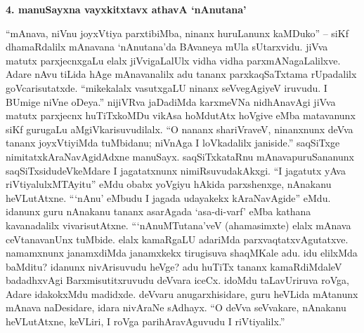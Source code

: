 \bigskip
\begin{center}
{\Large\bf 4. manuSayxna vayxkitxtavx athavA `nAnutana'}
\end{center}

``mAnava, niVnu joyxVtiya parxtibiMba, ninanx huruLanunx kaMDuko'' -- siKf dhamaRdalilx mAnavana `nAnutana'da BAvaneya mUla sUtarxvidu. jiVva matutx parxjecnxgaLu elalx jiVvigaLalUlx vidha vidha parxmANagaLalilxve. Adare nAvu tiLida hAge mAnavanalilx adu tananx parxkaqSaTxtama rUpadalilx goVcarisutatxde. ``mikekalalx vasutxgaLU ninanx seVvegAgiyeV iruvudu. I BUmige niVne oDeya.'' nijiVRva jaDadiMda karxmeVNa nidhAnavAgi jiVva matutx parxjecnx huTiTxkoMDu vikAsa hoMdutAtx hoVgive eMba matavanunx siKf gurugaLu aMgiVkarisuvudilalx. ``O nananx shariVraveV, ninanxnunx deVva tananx joyxVtiyiMda tuMbidanu; niVnAga I loVkadalilx janiside.'' saqSiTxge nimitatxkAraNavAgidAdxne manuSayx. saqSiTxkataRnu mAnavapuruSananunx saqSiTxsidudeVkeMdare I jagatatxnunx nimiRsuvudakAkxgi. ``I jagatutx yAva riVtiyalulxMTAyitu'' eMdu obabx yoVgiyu hAkida parxshenxge, nAnakanu heVLutAtxne. ```nAnu' eMbudu I jagada udayakekx kAraNavAgide'' eMdu. idanunx guru nAnakanu tananx asarAgada `asa-di-varf' eMba kathana kavanadalilx vivarisutAtxne. ```nAnuMTutana'veV (ahamasimxte) elalx mAnava ceVtanavanUnx tuMbide. elalx kamaRgaLU adariMda parxvaqtatxvAgutatxve. namamxnunx janamxdiMda janamxkekx tirugisuva shaqMKale adu. idu elilxMda baMditu? idanunx nivArisuvudu heVge? adu huTiTx tananx kamaRdiMdaleV badadhxvAgi Barxmisutitxruvudu deVvara iceCx. idoMdu taLavUriruva roVga, Adare idakokxMdu madidxde. deVvaru anugarxhisidare, guru heVLida mAtanunx mAnava naDesidare, idara nivAraNe sAdhayx. ``O deVva seVvakare, nAnakanu heVLutAtxne, keVLiri, I roVga parihAravAguvudu I riVtiyalilx.''

